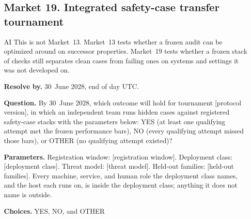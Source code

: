 \subsection{Market 19. Integrated safety-case transfer tournament}
\label{sec:appp-m19}
\begin{authbar}{AI}
This is not Market~13.
Market~13 tests whether a frozen audit can be optimized around on successor properties.
Market~19 tests whether a frozen stack of checks still separates clean cases from failing ones on systems and settings it was not developed on.

\end{authbar}
\begin{predictionbox}
\textbf{Resolve by.} 30~June 2028, end of day UTC.

\textbf{Question.}
By 30~June 2028, which outcome will hold for tournament [protocol version], in which an independent team runs hidden cases against registered safety-case stacks with the parameters below: YES (at least one qualifying attempt met the frozen performance bars), NO (every qualifying attempt missed those bars), or OTHER (no qualifying attempt existed)?

\textbf{Parameters.}
Registration window: [registration window].
Deployment class: [deployment class].
Threat model: [threat model].
Held-out families: [held-out families].
Every machine, service, and human role the deployment class names, and the host each runs on, is inside the deployment class; anything it does not name is outside.

\textbf{Choices.} YES, NO, and OTHER 
\end{predictionbox}

